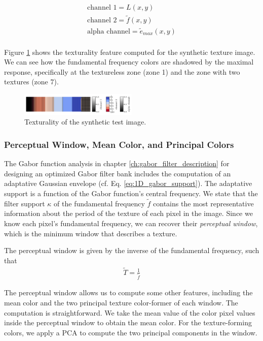 \documentclass[journal]{IEEEtran}
\begin{document}
\begin{gather}
    \text{channel 1} = L(x,y) \\
    \text{channel 2} = \widetilde{f}(x,y) \\
    \text{alpha channel} = \widetilde{e}_{max}(x,y) \\
\end{gather}

Figure \ref{fig:texturality_synth} shows the texturality feature computed for the synthetic texture image. We can see how the fundamental frequency colors are shadowed by the maximal response, specifically at the textureless zone (zone 1) and the zone with two textures (zone 7).

\begin{figure}[!ht]
	\includegraphics[width=0.5\textwidth]{texturality_synth}
    \caption{Texturality of the synthetic test image.}
    \label{fig:texturality_synth}
\end{figure}

\subsubsection{Perceptual Window, Mean Color, and Principal Colors}
The Gabor function analysis in chapter \ref{ch:gabor_filter_description} for designing an optimized Gabor filter bank includes the computation of an adaptative Gaussian envelope (cf. Eq. \eqref{eq:1D_gabor_support}). The adaptative support is a function of the Gabor function's central frequency. We state that the filter support $\kappa$ of the fundamental frequency $\widetilde{f}$ contains the most representative information about the period of the texture of each pixel in the image. Since we know each pixel's fundamental frequency, we can recover their \textit{perceptual window}, which is the minimum window that describes a texture.

The perceptual window is given by the inverse of the fundamental frequency, such that
\begin{gather}
    \widetilde{T} = \frac{1}{\widetilde{f}} \label{eq:perceptual_window}
\end{gather}

The perceptual window allows us to compute some other features, including the mean color and the two principal texture color-former of each window. The computation is straightforward. We take the mean value of the color pixel values inside the perceptual window to obtain the mean color. For the texture-forming colors, we apply a PCA to compute the two principal components in the window.
\end{document}
